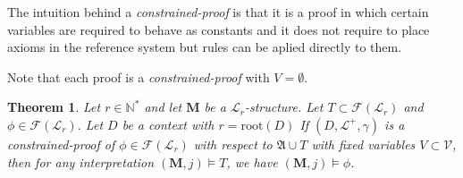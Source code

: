 \documentclass[10pt]{article}
\theoremstyle{plain}
\newtheorem{theorem}{Theorem}[section]
\newcommand{\N}{\mathbb{N}}
\newcommand{\F}{\mathcal{F}}
\renewcommand{\root}{\text{root}}
\renewcommand{\L}{\mathscr{L}}
\newcommand{\V}{\mathscr{V}}
\newcommand{\M}{\mathbf{M}}
\begin{document}
The intuition behind a \textit{constrained-proof} is that it is a proof in which certain variables are required to behave as constants and it does not require to place axioms in the reference system but rules can be aplied directly to them.


Note that each proof is a \textit{constrained-proof} with $V=\emptyset$.

\begin{theorem}
\label{soundnes-theorem}
Let $r\in \N^*$ and 
let $\M$ be a $\L_r$-structure.
Let $T\subset \F(\L_r)$ and $\phi\in \F(\L_r)$.
Let $D$ be a context with $r = \root(D)$
If $(D, \L^+, \gamma)$ is a constrained-proof of $\phi\in \F(\L_r)$ with respect to $\mathfrak{A}\cup T$ with fixed variables $V\subset\V$, 
then for any interpretation $(\M, j)\models T$, we have $(\M, j)\models \phi$.  
\end{theorem}
\end{document}
